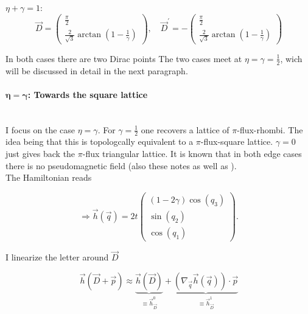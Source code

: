\documentclass[../../../main.tex]{subfiles}
\begin{document}
\underline{$\eta + \gamma = 1:$} \\

\begin{equation}
	\vec{D} = 
	\begin{pmatrix}
		\frac{\pi}{2} \\
		\frac{2}{\sqrt{3}}\arctan(1-\frac{1}{\gamma})
	\end{pmatrix}, \quad
	\vec{D}^\prime = -
	\begin{pmatrix}
		\frac{\pi}{2} \\
		\frac{2}{\sqrt{3}}\arctan(1-\frac{1}{\gamma})
	\end{pmatrix}
\end{equation}

In both cases there are two Dirac points The two cases meet at $\eta = \gamma = \frac12$, wich will be discussed in detail in the next paragraph. 

\paragraph{$\mathbf{\boldsymbol{\eta} = \boldsymbol{\gamma}}$: Towards the square lattice} \hfill \\ 

I focus on the case $\eta = \gamma$. For $\gamma = \frac12$ one recovers a lattice of $\pi$-flux-rhombi. The idea being that this is topologcally equivalent to a $\pi$-flux-square lattice. $\gamma = 0$ just gives back the $\pi$-flux triangular lattice. It is known that in both edge cases  there is no pseudomagnetic field (also these notes as well as \cite{Sun2023}). \\


The Hamiltonian reads 

\begin{equation}
	\Rightarrow\vec{h}(\vec{q}) = 2t 
	\begin{pmatrix}
		(1-2\gamma)\cos(q_3) \\
		\sin(q_2) \\
		\cos(q_1)
	\end{pmatrix}.
\end{equation}

I linearize the letter around $\vec{D}$

\begin{equation}
	\vec{h}(\vec{D}+\vec{p}) \approx \underbrace{\vec{h}(\vec{D})}_{\equiv \vec{h}^0_{\vec{D}}} + \underbrace{\left(\nabla_{\vec{q}} \vec{h}(\vec{q})\right) \cdot \vec{p}}_{\equiv \vec{h}_{\vec{D}}^1}
\end{equation}
\end{document}
